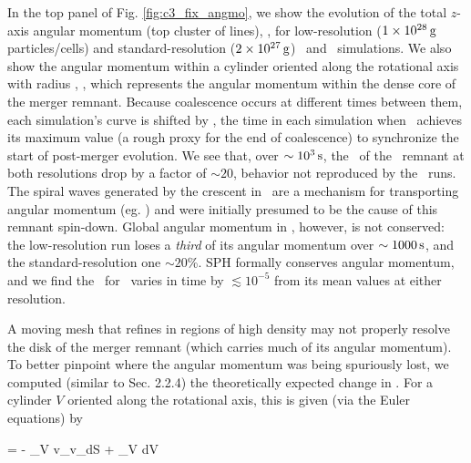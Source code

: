 In the top panel of Fig. \ref{fig:c3_fix_angmo}, we show the evolution of the total $z$-axis angular momentum (top cluster of lines), \Lztot, for low-resolution ($1\times10^{28}\,\mathrm{g}$ particles/cells) and standard-resolution ($2\times10^{27}\,\mathrm{g}$) \gasoline\ and \arepo\ simulations.  We also show the angular momentum within a cylinder oriented along the rotational axis with radius \innercyl, \Lzinner, which represents the angular momentum within the dense core of the merger remnant.  Because coalescence occurs at different times between them, each simulation's curve is shifted by \tlm, the time in each simulation when \Lzinner\ achieves its maximum value (a rough proxy for the end of coalescence) to synchronize the start of post-merger evolution.  We see that, over $\sim10^3\,\mathrm{s}$, the \Lzinner\ of the \arepo\ remnant at both resolutions drop by a factor of $\sim20$, behavior not reproduced by the \gasoline\ runs.  The spiral waves generated by the crescent in \arepo\ are a mechanism for transporting angular momentum {\charles (eg. \citealt{balb03})} and were initially presumed to be the cause of this remnant spin-down.  Global angular momentum in \arepo, however, is not conserved: the low-resolution run loses a \textit{third} of its angular momentum over $\sim1000\,\mathrm{s}$, and the standard-resolution one $\sim20$\%.  SPH formally conserves angular momentum, and we find the \Lztot\ for \gasoline\ varies in time by $\lesssim10^{-5}$ from its mean values at either resolution.


A moving mesh that refines in regions of high density may not properly resolve the disk of the merger remnant (which carries much of its angular momentum).  To better pinpoint where the angular momentum was being spuriously lost, we computed (similar to \cite{ji+13} Sec. 2.2.4) the theoretically expected change in \Lz.  For a cylinder $V$ oriented along the rotational axis, this is given (via the Euler equations) by

\eqbegin
{} = - \oint_V \rho \varpi v_\phi v_\varpi dS + \int_V {\boldmath \varpi}\times{\bf \nabla}\Phi dV
\label{eq:c3_angmobalance}
\eqend

